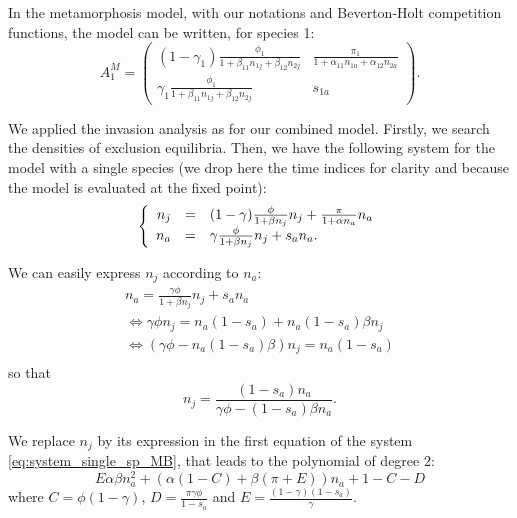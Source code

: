 \documentclass{article}
\begin{document}
In the metamorphosis model, with our notations and Beverton-Holt competition functions, the model can be written, for species 1:
\begin{equation}
    A_1^M = \begin{pmatrix}
    (1-\gamma_1)\frac{\phi_1}{1+\beta_{11}n_{1j}+\beta_{12}n_{2j}} & \frac{\pi_1}{1+\alpha_{11}n_{1a}+\alpha_{12}n_{2a}} \\
    \gamma_1\frac{\phi_1}{1+\beta_{11}n_{1j}+\beta_{12}n_{2j}} & s_{1a}
    \end{pmatrix}.
\end{equation}

We applied the invasion analysis as for our combined model. Firstly, we search the densities of exclusion equilibria. Then, we have the following system for the model with a single species (we drop here the time indices for clarity and because the model is evaluated at the fixed point):
\begin{equation}\label{eq:system_single_sp_MB}
    \left\{
\begin{array}{r c l}
n_j &=& (1-\gamma)\frac{\phi}{1+\beta n_j}n_j + \frac{\pi}{1+\alpha n_a}n_a\\
n_a &=& \gamma \frac{\phi}{1+\beta n_j}n_j + s_a n_a.
\end{array}
\right.
\end{equation}

We can easily express $n_j$ according to $n_a$:
\begin{align*}
    n_a = \frac{\gamma\phi}{1+\beta n_j}n_j + s_a n_a\\
    \Leftrightarrow \gamma\phi n_j = n_a(1-s_a)+n_a(1-s_a)\beta n_j\\
    \Leftrightarrow (\gamma\phi - n_a (1-s_a)\beta)n_j = n_a(1-s_a)\\
\end{align*}
so that 
\begin{equation}
    n_j = \frac{(1-s_a)n_a}{\gamma\phi - (1-s_a)\beta n_a}.
\end{equation}

We replace $n_j$ by its expression in the first equation of the system \eqref{eq:system_single_sp_MB}, that leads to the polynomial of degree 2:
\begin{equation}
    E\alpha\beta n_a^2 + \left(\alpha(1-C) +\beta(\pi+E)\right)n_a +1-C-D
\end{equation}
where $C = \phi(1-\gamma)$, $D=\frac{\pi\gamma\phi}{1-s_a}$ and $E=\frac{(1-\gamma)(1-s_a)}{\gamma}$.\\
\end{document}
